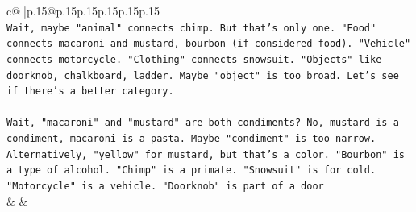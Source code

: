 \documentclass{article}
\begin{document}
{\begin{supertabular}{c@{$\;$}|p{.15\linewidth}@{}p{.15\linewidth}p{.15\linewidth}p{.15\linewidth}p{.15\linewidth}p{.15\linewidth}}
{{{\\ 
\texttt{Wait, maybe "animal" connects chimp. But that's only one. "Food" connects macaroni and mustard, bourbon (if considered food). "Vehicle" connects motorcycle. "Clothing" connects snowsuit. "Objects" like doorknob, chalkboard, ladder. Maybe "object" is too broad. Let's see if there's a better category.} \\
\\ 
\texttt{Wait, "macaroni" and "mustard" are both condiments? No, mustard is a condiment, macaroni is a pasta. Maybe "condiment" is too narrow. Alternatively, "yellow" for mustard, but that's a color. "Bourbon" is a type of alcohol. "Chimp" is a primate. "Snowsuit" is for cold. "Motorcycle" is a vehicle. "Doorknob" is part of a door} \\
            }
        }
    }
    & & \\ \\


\end{supertabular}}
\end{document}
